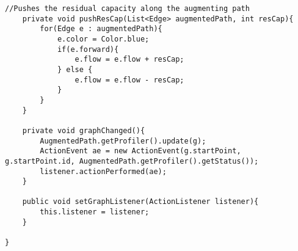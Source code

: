 \begin{lstlisting}[caption=MaxFlowFordFulkerson Source Code]
	//Pushes the residual capacity along the augmenting path
	private void pushResCap(List<Edge> augmentedPath, int resCap){
		for(Edge e : augmentedPath){
			e.color = Color.blue;
			if(e.forward){
				e.flow = e.flow + resCap;
			} else {
				e.flow = e.flow - resCap;
			}
		}
	}
	
	private void graphChanged(){
		AugmentedPath.getProfiler().update(g);
		ActionEvent ae = new ActionEvent(g.startPoint, g.startPoint.id, AugmentedPath.getProfiler().getStatus());
		listener.actionPerformed(ae);
	}
	
	public void setGraphListener(ActionListener listener){
		this.listener = listener;
	}
	
}
\end{lstlisting}